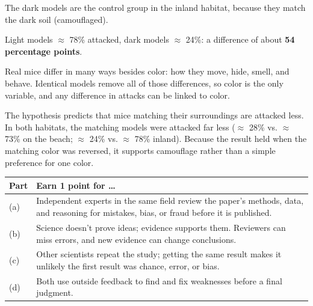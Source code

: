 \documentclass[11pt,letterpaper]{article}
\begin{document}
\modelanswer
\begin{parts}
  \item The dark models are the control group in the inland habitat, because they match the dark soil (camouflaged).
  \item Light models $\approx$ 78\% attacked, dark models $\approx$ 24\%: a difference of about \textbf{54 percentage points}.
  \item Real mice differ in many ways besides color: how they move, hide, smell, and behave. Identical models remove all of those differences, so color is the only variable, and any difference in attacks can be linked to color.
  \item The hypothesis predicts that mice matching their surroundings are attacked less. In both habitats, the matching models were attacked far less ($\approx$ 28\% vs. $\approx$ 73\% on the beach; $\approx$ 24\% vs. $\approx$ 78\% inland). Because the result held when the matching color was reversed, it supports camouflage rather than a simple preference for one color.
\end{parts}


\begin{center}
\begin{tabularx}{\linewidth}{@{}lY@{}}
\toprule
Part & Earn 1 point for \dots{} \\
\midrule
(a) & Independent experts in the same field review the paper's methods, data, and reasoning for mistakes, bias, or fraud before it is published. \\
(b) & Science doesn't prove ideas; evidence supports them. Reviewers can miss errors, and new evidence can change conclusions. \\
(c) & Other scientists repeat the study; getting the same result makes it unlikely the first result was chance, error, or bias. \\
(d) & Both use outside feedback to find and fix weaknesses before a final judgment. \\
\bottomrule
\end{tabularx}
\end{center}
\end{document}
